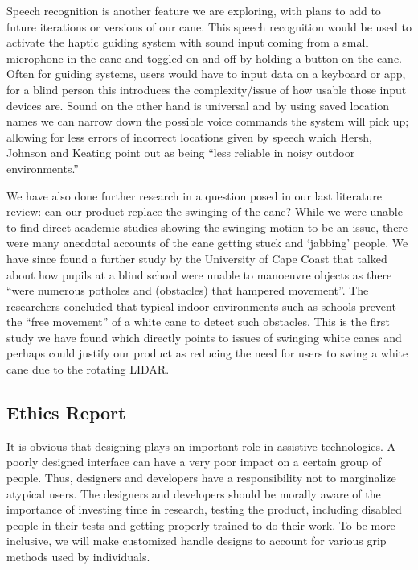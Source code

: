\documentclass{article}
\begin{document}
Speech recognition is another feature we are exploring, with plans to add to future iterations or versions of our cane. This speech recognition would be used to activate the haptic guiding system with sound input coming from a small microphone in the cane and toggled on and off by holding a button on the cane. Often for guiding systems, users would have to input data on a keyboard or app, for a blind person this introduces the complexity/issue of how usable those input devices are. Sound on the other hand is universal and by using saved location names we can narrow down the possible voice commands the system will pick up; allowing for less errors of incorrect locations given by speech which Hersh, Johnson and Keating point out as being “less reliable in noisy outdoor environments.” \cite{hershJohnsonKeating2008}
 
We have also done further research in a question posed in our last literature review: can our product replace the swinging of the cane? While we were unable to find direct academic studies showing the swinging motion to be an issue, there were many anecdotal accounts of the cane getting stuck and ‘jabbing’ people. We have since found a further study by the University of Cape Coast that talked about how pupils at a blind school were unable to manoeuvre objects as there “were numerous potholes and (obstacles) that hampered movement”. \cite{attiaBempong2020} The researchers concluded that typical indoor environments such as schools prevent the “free movement” of a white cane to detect such obstacles. This is the first study we have found which directly points to issues of swinging white canes and perhaps could justify our product as reducing the need for users to swing a white cane due to the rotating LIDAR.

\subsection{Ethics Report}

It is obvious that designing plays an important role in assistive technologies. A poorly designed interface can have a very poor impact on a certain group of people. Thus, designers and developers have a responsibility not to marginalize atypical users. The designers and developers should be morally aware of the importance of investing time in research, testing the product, including disabled people in their tests and getting properly trained to do their work. To be more inclusive, we will make customized handle designs to account for various grip methods used by individuals.
\end{document}
